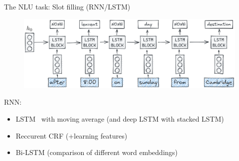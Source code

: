 \documentclass[10pt,aspectratio=169]{beamer}
\begin{document}
\begin{frame}{The NLU task: Slot filling (RNN/LSTM)}
    \begin{figure}
        \centering
        \includegraphics[width=.8\textwidth]{media/rnn_figure_general.png}
        \label{fig:hahn-split}
    \end{figure}

    \begin{block}{RNN:}
        \begin{itemize}
            \item LSTM  with moving average (and deep LSTM with stacked LSTM) \cite{yao-2014-spoken}
            \item Reccurent CRF \cite{mesnil-2015-using} (+learning features)
            \item Bi-LSTM \cite{ghannay-etal-2020-neural} (comparison of different word embeddings)
        \end{itemize}
    \end{block}
\end{frame}
\end{document}
